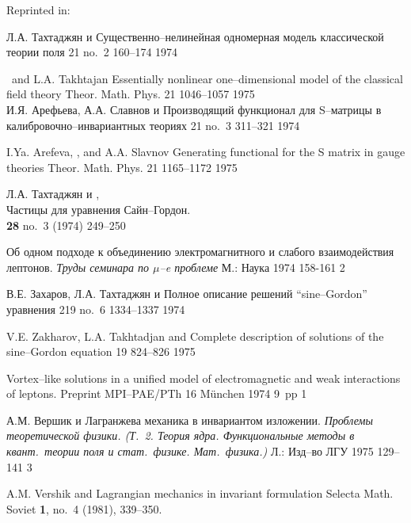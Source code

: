 Reprinted in: 

{Л.А. Тахтаджян и \LD}
{Существенно--нелинейная одномерная модель классической теории поля}
{\TMF} {21} {no.~2} {160--174} {1974}

{\LF\ and L.A. Takhtajan}
{Essentially nonlinear one--dimensional model of the classical
 field theory}
{Theor. Math. Phys.} {21} {1046--1057} {1975} \\

{И.Я. Арефьева, А.А. Славнов и \LD}
{Производящий функционал для S--матрицы в калибровочно--инвариантных теориях}
{\TMF} {21} {no.~3} {311--321} {1974}

{I.Ya. Arefeva, \LF, and A.A. Slavnov}
{Generating functional for the S matrix in gauge theories}
{Theor. Math. Phys.} {21} {1165--1172} {1975}

{Л.А. Тахтаджян и \LD}, \\
{Частицы для уравнения Сайн--Гордон}.\\
{\em \UMN} {\bf 28} {no.~3} {(1974)} {249--250}

{\LD}
{Об одном подходе к объединению электромагнитного и
слабого взаимодействия лептонов.}
{\em Труды семинара по $\mu$--e проблеме}
{М.: Наука} {} {1974} {} {158-161} {2}

{В.Е. Захаров, Л.А. Тахтаджян и \LD}
{Полное описание решений ``sine--Gordon'' уравнения}
{\DAN} {219} {no.~6} {1334--1337} {1974}

{V.E. Zakharov, L.A. Takhtadjan and \LF}
{Complete description of solutions of the sine--{G}ordon
  equation}
{\SPD} {19} {824--826} {1975}

{\LF} 
{Vortex--like solutions in a unified model of electromagnetic and
 weak interactions of leptons.} 
{Preprint MPI--PAE/PTh 16} {} {M\"unchen} {1974} {} {9~pp} {1}

{А.М. Вершик и \LD}
{Лагранжева механика в инвариантом изложении.}
{\em Проблемы теоретической физики. (Т.~2. Теория ядра.
 Функциональные методы в квант.\ теории поля и стат.\ физике.
 Мат.\ физика.)} {Л.: Изд--во ЛГУ} {} {1975} {} {129--141} {3}

{A.M. Vershik and \LF} 
{Lagrangian mechanics in invariant formulation} 
{Selecta Math. Soviet} {\bf 1}, no.~4 (1981), 339--350. \\

